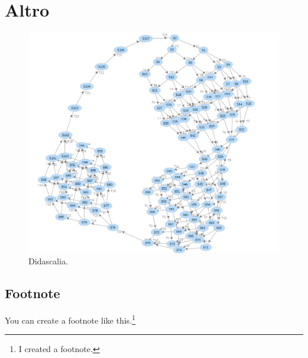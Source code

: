 \documentclass{FR16}
\begin{document}
\section{Altro}
\begin{figure}[H]
\centering
\includegraphics[width=1\textwidth]{grafo.png}
\caption{\label{fig:1}Didascalia.}
\end{figure}
\subsection{Footnote}
You can create a footnote like this.\footnote{I created a footnote.}
\end{document}
